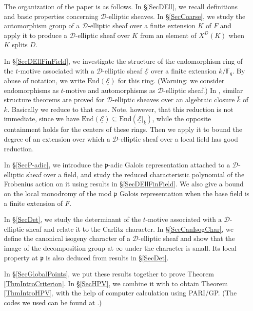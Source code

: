 \documentclass[10pt]{amsart}
\theoremstyle{plain}
\theoremstyle{definition}
\newcommand{\End}{\mathrm{End}}
\newcommand{\ucE}{\underline{\mathcal{E}}}
\newcommand{\bF}{\mathbb{F}}
\newcommand{\sD}{\mathscr{D}}
\newcommand{\frp}{\mathfrak{p}}
\begin{document}
The organization of the paper is as follows. In \S\ref{SecDEll}, we recall 
definitions and basic properties concerning $\sD$-elliptic sheaves. 
In \S\ref{SecCoarse}, we study the automorphism group of a $\sD$-elliptic sheaf over a finite extension $K$ of $F$ and 
apply it to produce a $\sD$-elliptic sheaf over $K$ from an element of $X^D(K)$ when $K$ splits $D$.

In \S\ref{SecDEllFinField}, we investigate the structure of the endomorphism ring of the $t$-motive associated with a $\sD$-elliptic sheaf $\ucE$ 
over a finite extension $k/\bF_q$. By abuse of notation, we write $\End(\ucE)$ for this ring. (Warning: we consider endomorphisms as $t$-motive
and automorphisms as $\sD$-elliptic sheaf.)
In \cite{LRS, Hau}, similar structure theorems are proved for $\sD$-elliptic sheaves over an algebraic closure $\bar{k}$ of $k$. 
Basically we reduce to that case.
Note, however, that this reduction is not immediate, since we have 
$\End(\ucE)\subseteq \End(\ucE|_{\bar{k}})$, while the opposite containment 
holds for the centers of
these rings. Then we apply it to bound the degree of an extension over which a $\sD$-elliptic sheaf over a local field has good reduction.

In \S\ref{SecP-adic}, we introduce the $\frp$-adic Galois representation 
attached to a $\sD$-elliptic sheaf over a field, and study the reduced characteristic polynomial
of the Frobenius action on it using results in \S\ref{SecDEllFinField}. We also give a bound on the local monodromy of the mod $\frp$
Galois representation when the base field is a finite extension of $F$.

In \S\ref{SecDet}, we study the determinant of the $t$-motive associated with a $\sD$-elliptic sheaf and relate it to the Carlitz character.
In \S\ref{SecCanIsogChar}, we define the canonical isogeny character of a 
$\sD$-elliptic sheaf and show that the image of the decomposition group at $\infty$ under the character is small.
Its local property at $\frp$ is also deduced from results in \S\ref{SecDet}.

In \S\ref{SecGlobalPoints}, we put these results together to prove Theorem \ref{ThmIntroCriterion}. In \S\ref{SecHPV}, we combine it with \cite{Pap_loc} 
to obtain Theorem \ref{ThmIntroHPV}, with the help of computer calculation using PARI/GP. (The codes we used can be found at \cite{Ha_codes}.)  
\end{document}
